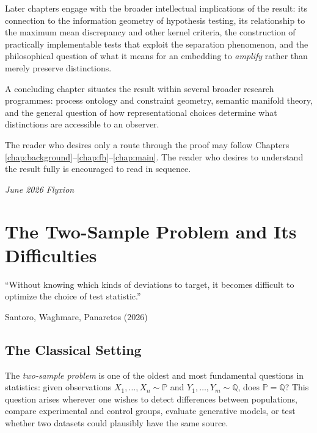 \documentclass[12pt, oneside]{book}
\theoremstyle{plain}
\theoremstyle{definition}
\newcommand{\PP}{\mathbb{P}}
\newcommand{\QQ}{\mathbb{Q}}
\begin{document}
Later chapters engage with the broader intellectual implications of the result: its connection to the information geometry of hypothesis testing, its relationship to the maximum mean discrepancy and other kernel criteria, the construction of practically implementable tests that exploit the separation phenomenon, and the philosophical question of what it means for an embedding to \emph{amplify} rather than merely preserve distinctions.

A concluding chapter situates the result within several broader research programmes: process ontology and constraint geometry, semantic manifold theory, and the general question of how representational choices determine what distinctions are accessible to an observer.

The reader who desires only a route through the proof may follow Chapters \ref{chap:background}--\ref{chap:fh}--\ref{chap:main}. The reader who desires to understand the result fully is encouraged to read in sequence.

\bigskip
\noindent\textit{June 2026 \hfill Flyxion}

\clearpage

\mainmatter

\chapter{The Two-Sample Problem and Its Difficulties}
\label{chap:twosample}

\epigraph{``Without knowing which kinds of deviations to target, it becomes difficult
to optimize the choice of test statistic.''}{Santoro, Waghmare, Panaretos (2026)}

\section{The Classical Setting}

The \emph{two-sample problem} is one of the oldest and most fundamental questions in statistics: given observations $X_1, \ldots, X_n \sim \PP$ and $Y_1, \ldots, Y_m \sim \QQ$, does $\PP = \QQ$? This question arises wherever one wishes to detect differences between populations, compare experimental and control groups, evaluate generative models, or test whether two datasets could plausibly have the same source.
\end{document}
